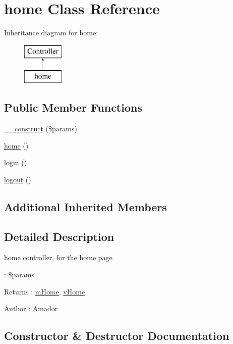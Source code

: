 \hypertarget{classhome}{}\section{home Class Reference}
\label{classhome}
Inheritance diagram for home\+:\begin{figure}[H]
\begin{center}
\leavevmode
\includegraphics[height=2.000000cm]{classhome}
\end{center}
\end{figure}
\subsection*{Public Member Functions}
\begin{DoxyCompactItemize}
\item 
\hyperlink{classhome_a8e8dea6e318a555043df639cfa08bfe1}{\+\_\+\+\_\+construct} (\$params)
\item 
\hyperlink{classhome_af03fe50ecf8bf44292f3a90b670c2c2d}{home} ()
\item 
\hyperlink{classhome_ab8a0d4e5bd8b6b683a66ca8086db502a}{login} ()
\item 
\hyperlink{classhome_ade68b875784d0089e2698a577003971d}{logout} ()
\end{DoxyCompactItemize}
\subsection*{Additional Inherited Members}


\subsection{Detailed Description}
home controller, for the home page

\+: \$params \begin{DoxyReturn}{Returns}
\+: \hyperlink{classmHome}{m\+Home}, \hyperlink{classvHome}{v\+Home} 
\end{DoxyReturn}
\begin{DoxyAuthor}{Author}
\+: Amador 
\end{DoxyAuthor}


\subsection{Constructor \& Destructor Documentation}
\hypertarget{classhome_a8e8dea6e318a555043df639cfa08bfe1}{}
